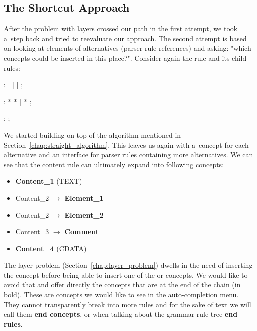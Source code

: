 \subsection{The Shortcut Approach}
\label{chap:shortcut_approach}

After the problem with layers crossed our path in the first attempt, we took a~step back and tried to reevaluate our approach.
The second attempt is based on looking at elements of alternatives (parser rule references) and asking: "which concepts could be inserted in this place?".
Consider again the  rule and its child rules:

\begin{antlr}
	    :   
           |   
           |   
           |   
           ;

	    :   \literal{<}  * \literal{>} * \literal{</}  \literal{>}
           |   \literal{<}  * \literal{/>}
           ;

	    :   \literal{<!--}  \literal{-->} ;
\end{antlr}

We started building on top of the algorithm mentioned in Section~\ref{chap:straight_algorithm}.
This leaves us again with a~concept for each alternative and an interface for parser rules containing more alternatives.
We can see that the content rule can ultimately expand into following concepts:

\begin{itemize}
	\itemsep0em
	\item \textbf{Content{\_}1} (TEXT)
	\item Content{\_}2 $\rightarrow$ \textbf{Element{\_}1}
	\item Content{\_}2 $\rightarrow$ \textbf{Element{\_}2}
	\item Content{\_}3 $\rightarrow$ \textbf{Comment}
	\item \textbf{Content{\_}4} (CDATA)
\end{itemize}

The layer problem (Section~\ref{chap:layer_problem}) dwells in the need of inserting the  concept before being able to insert one of the  or  concepts.
We would like to avoid that and offer directly the concepts that are at the end of the chain (in bold).
These are concepts we would like to see in the auto-completion menu.
They cannot transparently break into more rules and for the sake of text we will call them \textbf{end concepts}, or when talking about the grammar rule tree \textbf{end rules}.
\\

